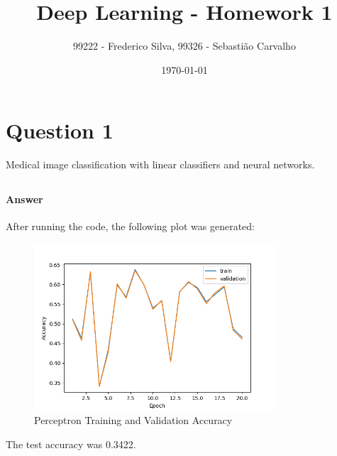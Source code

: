\documentclass{article}
\title{Deep Learning - Homework 1}
\author{99222 - Frederico Silva, 99326 - Sebastião Carvalho}
\date{\today}
\begin{document}
\maketitle

\tableofcontents

\section{Question 1}

Medical image classification with linear classifiers and neural networks.

\subsection{}

\subsubsection{}

\paragraph{Answer} After running the code, the following plot was generated:
\begin{figure}[H]
    \centering
    \includegraphics[width=0.8\textwidth]{"plots/1_1_a.png"}
    \caption{Perceptron Training and Validation Accuracy}
    \label{1.1.a Plot}
\end{figure}

The test accuracy was 0.3422.

\subsubsection{}
\end{document}
